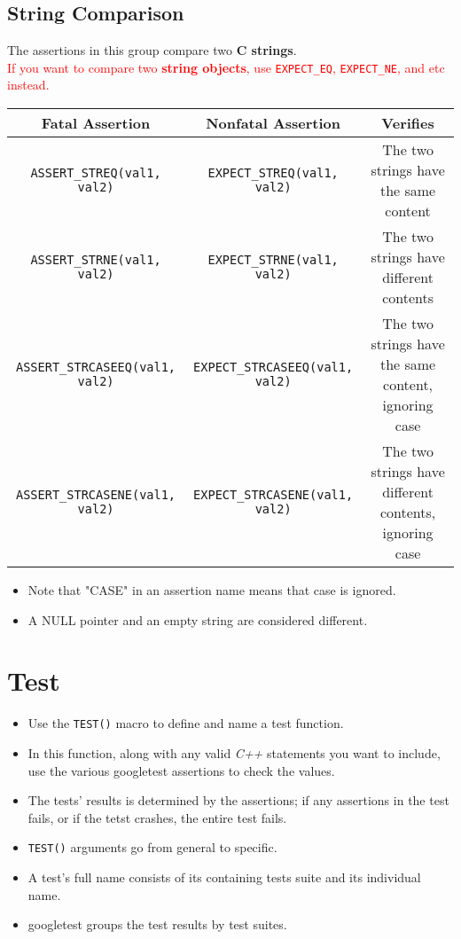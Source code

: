 \documentclass[letterpaper,11pt]{report}
\begin{document}
\subsection*{String Comparison}
The assertions in this group compare two \textbf{C strings}.\\
\textcolor{red}{If you want to compare two \textbf{string objects}, use \texttt{EXPECT\_EQ}, \texttt{EXPECT\_NE}, and etc instead.}
\begin{center}
    \footnotesize{
    \begin{tabular}{| c | c | c |}
        \hline
        \textbf{Fatal Assertion}           & \textbf{Nonfatal Assertion}     & \textbf{Verifies}     \\ \hline 
        \texttt{ASSERT\_STREQ(val1, val2)} & \texttt{EXPECT\_STREQ(val1, val2)} & The two strings have the same content \\ \hline
        \texttt{ASSERT\_STRNE(val1, val2)} & \texttt{EXPECT\_STRNE(val1, val2)} & The two strings have different contents \\ \hline
        \texttt{ASSERT\_STRCASEEQ(val1, val2)} & \texttt{EXPECT\_STRCASEEQ(val1, val2)} & The two strings have the same content, ignoring case \\ \hline
        \texttt{ASSERT\_STRCASENE(val1, val2)} & \texttt{EXPECT\_STRCASENE(val1, val2)} & The two strings have different contents, ignoring case \\ \hline
    \end{tabular}}
\end{center}
\begin{itemize}
    \item Note that "CASE" in an assertion name means that case is ignored.
    \item A NULL pointer and an empty string are considered different.
\end{itemize}

\section*{Test}
\begin{itemize}
    \item Use the \texttt{TEST()} macro to define and name a test function.
    \item In this function, along with any valid \textit{C++} statements you want to include, use 
        the various googletest assertions to check the values.
    \item The tests' results is determined by the assertions; if any assertions in the test fails, or
        if the tetst crashes, the entire test fails.
    \item \texttt{TEST()} arguments go from general to specific.
    \item A test's full name consists of its containing tests suite and its individual name.
    \item googletest groups the test results by test suites.
\end{itemize}
\end{document}
